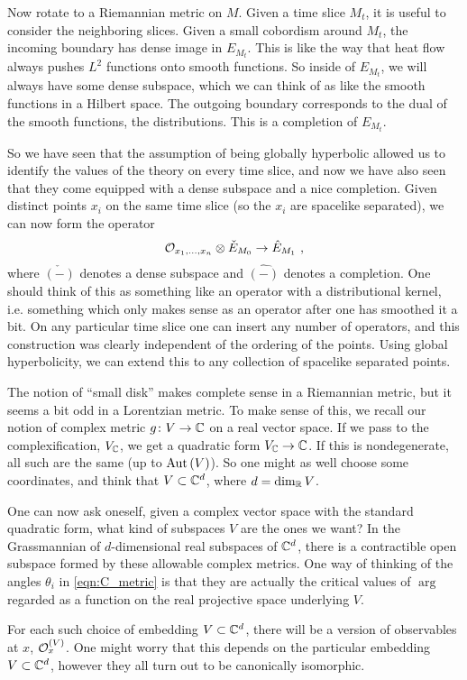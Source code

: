 Now rotate to a Riemannian metric on $M$.
Given a time slice $M_t$, it is useful to consider the neighboring slices.
Given a small cobordism around $M_t$, the incoming boundary has dense image in $E_{M_t}$.
This is like the way that heat flow always pushes $L^2$ functions onto smooth functions. 
So inside of $E_{M_t}$, we will always have some dense subspace, which we can think of as
like the smooth functions in a Hilbert space.
The outgoing boundary corresponds to the dual of the smooth functions, the distributions. 
This is a completion of $E_{M_t}$.

So we have seen that the assumption of being globally hyperbolic allowed us to identify
the values of the theory on every time slice, and now we have also seen that they come
equipped with a dense subspace and a nice completion. 
Given distinct points $x_i$ on the same time slice (so the $x_i$ are spacelike separated),
we can now form the operator 
\begin{equation*}
\mathcal{O}_{x_1, \dots, x_n} \otimes \check{E}_{M_0} \to \hat{E}_{M_1} \ ,
\end{equation*}
where $\check{\left(-\right)}$ denotes a dense subspace and $\hat{\left(-\right)}$ denotes a completion.
One should think of this as something like an operator with a distributional kernel, i.e.
something which only makes sense as an operator after one has 
smoothed it a bit.
On any particular time slice one can insert any number of operators, and this construction
was clearly independent of the ordering of the points. 
Using global hyperbolicity, we can extend this to any collection of spacelike separated
points.

\begin{rmk}
The notion of ``small disk'' makes complete sense in a Riemannian metric, but it seems a
bit odd in a Lorentzian metric.
To make sense of this, we recall our notion of complex metric $g \colon V \to \mathbb{C}$ on a
real vector space.
If we pass to the complexification, $V_{\mathbb{C}}$, we get a quadratic form $V_{\mathbb{C}} \to \mathbb{C}$.
If this is nondegenerate, all such are the same (up to $\operatorname{Aut}\left(V\right)$).
So one might as well choose some coordinates, and think that $V\subset \mathbb{C}^d$,
where $d = \dim_{\mathbb{R}} V$.

One can now ask oneself, given a complex vector space with the standard quadratic form,
what kind of subspaces $V$ are the ones we want?
In the Grassmannian of $d$-dimensional real subspaces of $\mathbb{C}^d$, there is a contractible
open subspace formed by these allowable complex metrics.
One way of thinking of the angles $\theta_i$ in \eqref{eqn:C_metric}
is that they are actually the critical values of $\arg$ regarded as a function on the real
projective space underlying $V$.

For each such choice of embedding $V\subset \mathbb{C}^d$, there will be a version of observables
at $x$, $\mathcal{O}_x^{\left(V\right)}$.
One might worry that this depends on the particular embedding $V\subset \mathbb{C}^d$, however
they all turn out to be canonically isomorphic. 
\end{rmk}

